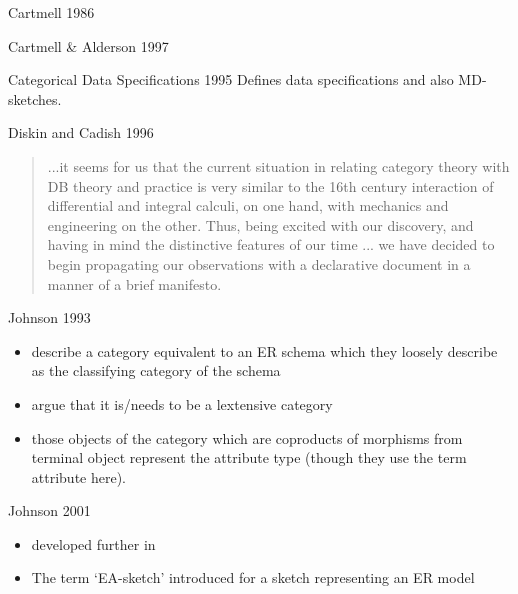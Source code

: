 


\begin{frame}{Cartmell 1986}
\end{frame}

\begin{frame}{Cartmell \& Alderson 1997}
\end{frame}

\begin{frame}{Categorical Data Specifications 1995}
Defines data specifications and also MD-sketches.
\end{frame}

\begin{frame}{Diskin and Cadish 1996}
\begin{quote}
...it seems for us that
the current situation in relating category theory with DB theory and practice is very similar to the 16th
century interaction of differential and integral calculi, on one hand, with mechanics and engineering on
the other. Thus, being excited with our discovery, and having in mind the distinctive features of our time
... we have decided to begin propagating our observations with a declarative document in
a manner of a brief manifesto.
\end{quote}
\end{frame}

\begin{frame}{Johnson 1993}
\begin{itemize} \footnotesize
\item describe a category equivalent to an ER schema which they loosely describe as the classifying category of the schema
\item argue that it is/needs to be a lextensive category
\item those objects of the category which are coproducts of morphisms from terminal object represent the attribute type (though they use the term attribute here).
\end{itemize}
\end{frame}

\begin{frame}{Johnson 2001}

\begin{itemize} \footnotesize{}
\pause \item developed further in  \cite{Johnson2002ERA}
\pause \item The term `EA-sketch' introduced for a sketch representing an ER model 
\end{itemize}
\end{frame}

